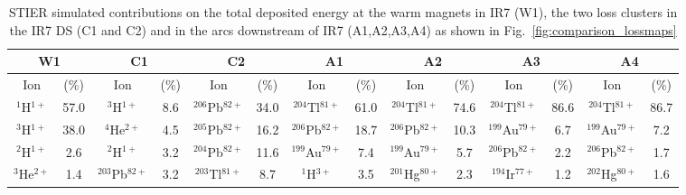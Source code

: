 \begin{table*}[htbp]
\caption{STIER simulated contributions on the total deposited energy at the warm magnets in IR7 (W1), the two loss clusters in the IR7 DS (C1 and C2) and in the arcs downstream of IR7 (A1,A2,A3,A4) as shown in Fig.~\ref{fig:comparison_lossmaps} }
\small
\setlength\tabcolsep{2.5pt}
\centering
\label{tab:contrib}
\begin{tabular}{cc|cc|cc|cc|cc|cc|cc}
\toprule
\multicolumn{2}{c}{W1}                 & \multicolumn{2}{c}{C1}                 & \multicolumn{2}{c}{C2}         & \multicolumn{2}{c}{A1}                 & \multicolumn{2}{c}{A2}                 & \multicolumn{2}{c}{A3}                 & \multicolumn{2}{c}{A4}                    \\ \midrule
Ion            &  (\%) & Ion            &  (\%) & Ion  & (\%)   &   Ion            &  (\%) & Ion            &  (\%) & Ion            &  (\%) & Ion            &  (\%) \\ \midrule
$^{1}$H$^{1+}$ & 57.0              & $^{3}$H$^{1+}$ & 8.6              & $^{206}$Pb$^{82+}$ & 34.0            & $^{204}$Tl$^{81+}$ & 61.0              & $^{204}$Tl$^{81+}$ & 74.6              & $^{204}$Tl$^{81+}$ & 86.6              & $^{204}$Tl$^{81+}$ & 86.7              \\

$^{3}$H$^{1+}$ & 38.0              & $^{4}$He$^{2+}$ & 4.5              & $^{205}$Pb$^{82+}$ & 16.2          & $^{206}$Pb$^{82+}$ & 18.7              & $^{206}$Pb$^{82+}$ & 10.3              & $^{199}$Au$^{79+}$ & 6.7               & $^{199}$Au$^{79+}$ & 7.2               \\

$^{2}$H$^{1+}$ & 2.6               & $^{2}$H$^{1+}$ & 3.2               & $^{204}$Pb$^{82+}$ & 11.6            & $^{199}$Au$^{79+}$ & 7.4               & $^{199}$Au$^{79+}$ & 5.7               & $^{206}$Pb$^{82+}$ & 2.2               & $^{206}$Pb$^{82+}$ & 1.7               \\

$^{3}$He$^{2+}$     & 1.4               & $^{203}$Pb$^{82+}$ & 3.2               & $^{203}$Tl$^{81+}$ & 8.7         & $^{1}$H$^{3+}$     & 3.5               & $^{201}$Hg$^{80+}$ & 2.3               & $^{194}$Ir$^{77+}$ & 1.2               & $^{202}$Hg$^{80+}$ & 1.6              
\\ \bottomrule             
\end{tabular}
\end{table*}





